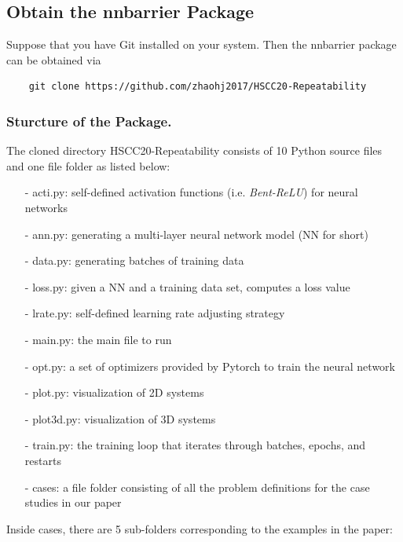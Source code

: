 \documentclass{llncs}
\begin{document}
\subsection{Obtain the \textsf{nnbarrier} Package}
Suppose that you have \textsf{Git} installed on your system. Then the \textsf{nnbarrier} package can be obtained via
\begin{verbatim}              
    git clone https://github.com/zhaohj2017/HSCC20-Repeatability
\end{verbatim}

\subsubsection{Sturcture of the Package.}
The cloned directory \textsf{HSCC20-Repeatability} consists of 10 \textsf{Python} source files and one file folder as listed below:
\begin{itemize}
    \item[-] \textsf{acti.py}: self-defined activation functions (i.e. \emph{Bent-ReLU}) for neural networks
    \item[-] \textsf{ann.py}: generating a multi-layer neural network model (NN for short)
    \item[-] \textsf{data.py}: generating batches of training data
    \item[-] \textsf{loss.py}: given a NN and a training data set, computes a loss value
    \item[-] \textsf{lrate.py}: self-defined learning rate adjusting strategy
    \item[-] \textsf{main.py}: the main file to run
    \item[-] \textsf{opt.py}: a set of optimizers provided by \textsf{Pytorch} to train the neural network
    \item[-] \textsf{plot.py}: visualization of 2D systems
    \item[-] \textsf{plot3d.py}: visualization of 3D systems
    \item[-] \textsf{train.py}: the training loop that iterates through batches, epochs, and restarts
    \item[-] {\color{blue}\textsf{cases}}: a file folder consisting of all the problem definitions for the case studies in our paper
\end{itemize}
Inside {\color{blue}\textsf{cases}}, there are 5 sub-folders corresponding to the examples in the paper:
\end{document}
